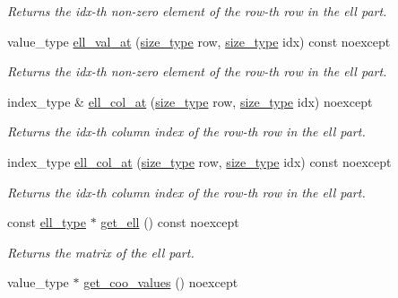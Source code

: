 \begin{DoxyCompactItemize}
\begin{DoxyCompactList}\small\item\em Returns the {\ttfamily idx}-\/th non-\/zero element of the {\ttfamily row}-\/th row in the ell part. \end{DoxyCompactList}\item 
value\+\_\+type \hyperlink{classgko_1_1matrix_1_1Hybrid_a3e0ab990e82db430d0e05fe165a11620}{ell\+\_\+val\+\_\+at} (\hyperlink{namespacegko_a6e5c95df0ae4e47aab2f604a22d98ee7}{size\+\_\+type} row, \hyperlink{namespacegko_a6e5c95df0ae4e47aab2f604a22d98ee7}{size\+\_\+type} idx) const noexcept
\begin{DoxyCompactList}\small\item\em Returns the {\ttfamily idx}-\/th non-\/zero element of the {\ttfamily row}-\/th row in the ell part. \end{DoxyCompactList}\item 
index\+\_\+type \& \hyperlink{classgko_1_1matrix_1_1Hybrid_ad41c68dbda50589378ad481c0ab8feea}{ell\+\_\+col\+\_\+at} (\hyperlink{namespacegko_a6e5c95df0ae4e47aab2f604a22d98ee7}{size\+\_\+type} row, \hyperlink{namespacegko_a6e5c95df0ae4e47aab2f604a22d98ee7}{size\+\_\+type} idx) noexcept
\begin{DoxyCompactList}\small\item\em Returns the {\ttfamily idx}-\/th column index of the {\ttfamily row}-\/th row in the ell part. \end{DoxyCompactList}\item 
index\+\_\+type \hyperlink{classgko_1_1matrix_1_1Hybrid_a3a2d9b00dd8b2333b05a97d968dfabff}{ell\+\_\+col\+\_\+at} (\hyperlink{namespacegko_a6e5c95df0ae4e47aab2f604a22d98ee7}{size\+\_\+type} row, \hyperlink{namespacegko_a6e5c95df0ae4e47aab2f604a22d98ee7}{size\+\_\+type} idx) const noexcept
\begin{DoxyCompactList}\small\item\em Returns the {\ttfamily idx}-\/th column index of the {\ttfamily row}-\/th row in the ell part. \end{DoxyCompactList}\item 
const \hyperlink{classgko_1_1matrix_1_1Ell}{ell\+\_\+type} $\ast$ \hyperlink{classgko_1_1matrix_1_1Hybrid_afe9a3a9a801271d5ead4774fff7ffbd7}{get\+\_\+ell} () const noexcept
\begin{DoxyCompactList}\small\item\em Returns the matrix of the ell part. \end{DoxyCompactList}\item 
value\+\_\+type $\ast$ \hyperlink{classgko_1_1matrix_1_1Hybrid_a8513b46a3abb728b725fc26af81d09b9}{get\+\_\+coo\+\_\+values} () noexcept

\end{DoxyCompactItemize}
